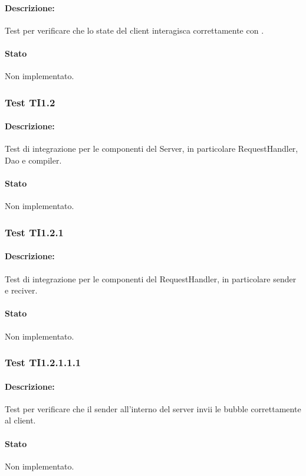 \documentclass[../PianoDiQualifica.tex]{subfiles}
\begin{document}
	\paragraph{Descrizione:} Test per verificare che lo state del client interagisca correttamente con . 
	\paragraph{Stato} Non implementato.
	
	\subsubsection{Test TI1.2}
	\paragraph{Descrizione:} Test di integrazione per le componenti del Server, in particolare RequestHandler, Dao e compiler.
	\paragraph{Stato} Non implementato.
	
	\subsubsection{Test TI1.2.1}
	\paragraph{Descrizione:} Test di integrazione per le componenti del RequestHandler, in particolare sender e reciver.
	\paragraph{Stato} Non implementato.
	\subsubsection{Test TI1.2.1.1.1}
	\paragraph{Descrizione:} Test per verificare che il sender all'interno del server invii le bubble correttamente al client.
	\paragraph{Stato} Non implementato.
	
\end{document}

